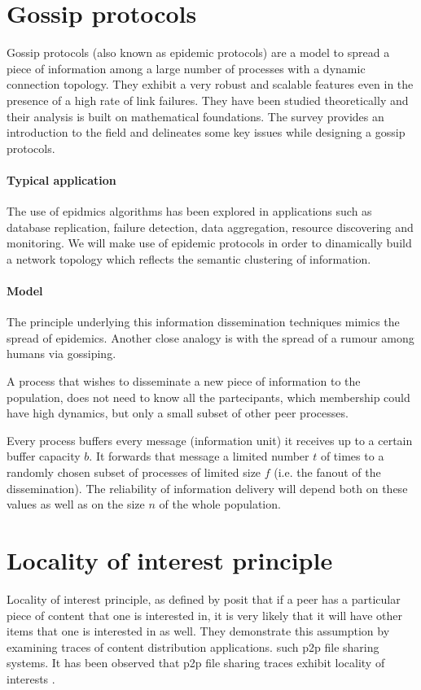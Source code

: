 \section{Gossip protocols}
Gossip protocols (also known as epidemic protocols) are a model to spread a piece of information among a large number of processes with a dynamic connection topology. They exhibit a very robust and scalable features even in the presence of a high rate of link failures. They have been studied theoretically and their analysis is built on mathematical foundations. The survey \cite{EUG04} provides an introduction to the field and delineates some key issues while designing a gossip protocols.

\paragraph{Typical application} The use of epidmics algorithms has been explored in applications such as database replication, failure detection, data aggregation, resource discovering and monitoring. We will make use of epidemic protocols in order to dinamically build a network topology which reflects the semantic clustering of information.

\paragraph{Model}The principle underlying this information dissemination techniques mimics the spread of epidemics. Another close analogy is with the spread of a rumour among humans via gossiping.

A process that wishes to disseminate a new piece of information to the population, does not need to know all the partecipants, which membership could have high dynamics, but only a small subset of other peer processes.

Every process buffers every message (information unit) it receives up to a certain buffer capacity $b$. It forwards that message a limited number $t$ of times to a randomly chosen subset of processes of limited size $f$ (i.e. the fanout of the dissemination). The reliability of information delivery will depend both on these values as well as on the size $n$ of the whole population.

\section{Locality of interest principle} Locality of interest principle, as defined by \cite{SMZ03} posit that if a peer has a particular piece of content that one is interested in, it is very likely that it will have other items that one is interested in as well. They demonstrate this assumption by examining traces of content distribution applications. such p2p file sharing systems. It has been observed that p2p file sharing traces exhibit locality of interests \cite{SMZ03}.

